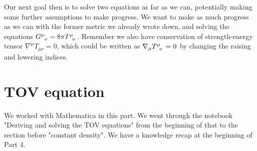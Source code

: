 \documentclass[10pt]{article}
\begin{document}
Our next goal then is to solve two equations as far as we can, potentially making some further assumptions to make progress. We want to make as much progress as we can with the former metric we already wrote down, and solving the equations $\tensor{G}{^\mu_\nu}=8\pi\tensor{T}{^\mu_\nu}$. Remember we also have conservation of strength-energy tensor $\nabla^\mu T_{\mu\nu}=0$, which could be written as $\nabla{_\mu} \tensor{T}{^\mu_\nu}=0$ by changing the raising and lowering indices.
\newpage
\part{TOV equation}
We worked with Mathematica in this part. We went through the notebook "Deriving and solving the TOV equations" from the beginning of that to the section before "constant density". We have a knowledge recap at the beginning of Part 4.
\newpage
\end{document}
